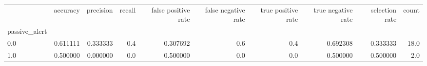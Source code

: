 \begin{tabular}{lrrrrrrrrr}
\toprule
{} &  accuracy &  precision &  recall &  false positive rate &  false negative rate &  true positive rate &  true negative rate &  selection rate &  count \\
passive\_alert &           &            &         &                      &                      &                     &                     &                 &        \\
\midrule
0.0           &  0.611111 &   0.333333 &     0.4 &             0.307692 &                  0.6 &                 0.4 &            0.692308 &        0.333333 &   18.0 \\
1.0           &  0.500000 &   0.000000 &     0.0 &             0.500000 &                  0.0 &                 0.0 &            0.500000 &        0.500000 &    2.0 \\
\bottomrule
\end{tabular}
